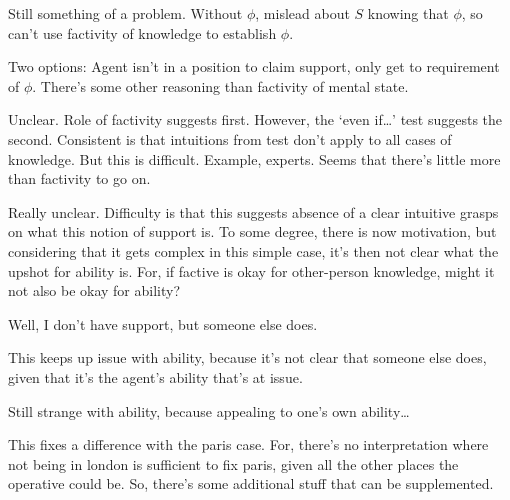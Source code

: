 \begin{note}[Application of \nI{} to \AR{}]
{    Still something of a problem.
    Without \(\phi\), mislead about \(S\) knowing that \(\phi\), so can't use factivity of knowledge to establish \(\phi\).

    Two options:
    Agent isn't in a position to claim support, only get to requirement of \(\phi\).
    There's some other reasoning than factivity of mental state.

    Unclear.
    Role of factivity suggests first.
    However, the `even if\dots' test suggests the second.
    Consistent is that intuitions from test don't apply to all cases of knowledge.
    But this is difficult.
    Example, experts.
    Seems that there's little more than factivity to go on.

    Really unclear.
    Difficulty is that this suggests absence of a clear intuitive grasps on what this notion of support is.
    To some degree, there is now motivation, but considering that it gets complex in this simple case, it's then not clear what the upshot for ability is.
    For, if factive is okay for other-person knowledge, might it not also be okay for ability?

    Well, I don't have support, but someone else does.

    This keeps up issue with ability, because it's not clear that someone else does, given that it's the agent's ability that's at issue.

    Still strange with ability, because appealing to one's own ability\dots
  }

  {
    This fixes a difference with the paris case.
    For, there's no interpretation where not being in london is sufficient to fix paris, given all the other places the operative could be.
    So, there's some additional stuff that can be supplemented.
  }
\end{note}


